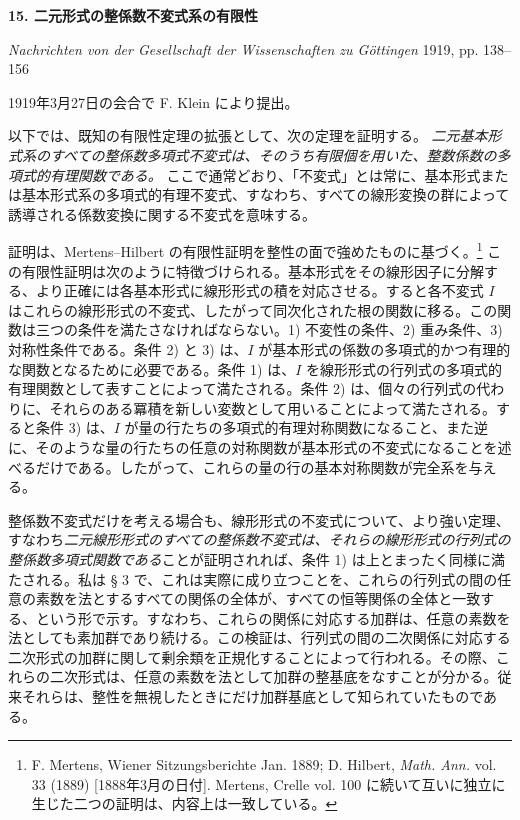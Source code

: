 \providecommand{\frH}{\mathfrak H}
\providecommand{\frK}{\mathfrak K}
\providecommand{\frM}{\mathfrak M}
\providecommand{\frN}{\mathfrak N}
\providecommand{\frG}{\mathfrak G}
\providecommand{\frS}{\mathfrak S}
\providecommand{\tmod}[1]{\;(\operatorname{mod} #1)}

\clearpage
\begin{center}
{\Large\bfseries 15. 二元形式の整係数不変式系の有限性}\par
\vspace{1em}
\emph{Nachrichten von der Gesellschaft der Wissenschaften zu Göttingen} 1919, pp. 138--156
\end{center}

\vspace{2em}
\begin{center}
1919年3月27日の会合で F. Klein により提出。
\end{center}

以下では、既知の有限性定理の拡張として、次の定理を証明する。
\emph{二元基本形式系のすべての整係数多項式不変式は、そのうち有限個を用いた、整数係数の多項式的有理関数である。}
ここで通常どおり、「不変式」とは常に、基本形式または基本形式系の多項式的有理不変式、すなわち、すべての線形変換の群によって誘導される係数変換に関する不変式を意味する。

証明は、Mertens--Hilbert の有限性証明を整性の面で強めたものに基づく。\footnote{F. Mertens, Wiener Sitzungsberichte Jan. 1889; D. Hilbert, \emph{Math. Ann.} vol. 33 (1889) [1888年3月の日付]. Mertens, Crelle vol. 100 に続いて互いに独立に生じた二つの証明は、内容上は一致している。}
この有限性証明は次のように特徴づけられる。基本形式をその線形因子に分解する、より正確には各基本形式に線形形式の積を対応させる。すると各不変式 \(I\) はこれらの線形形式の不変式、したがって同次化された根の関数に移る。この関数は三つの条件を満たさなければならない。1) 不変性の条件、2) 重み条件、3) 対称性条件である。条件 2) と 3) は、\(I\) が基本形式の係数の多項式的かつ有理的な関数となるために必要である。条件 1) は、\(I\) を線形形式の行列式の多項式的有理関数として表すことによって満たされる。条件 2) は、個々の行列式の代わりに、それらのある冪積を新しい変数として用いることによって満たされる。すると条件 3) は、\(I\) が量の行たちの多項式的有理対称関数になること、また逆に、そのような量の行たちの任意の対称関数が基本形式の不変式になることを述べるだけである。したがって、これらの量の行の基本対称関数が完全系を与える。

整係数不変式だけを考える場合も、線形形式の不変式について、より強い定理、すなわち\emph{二元線形形式のすべての整係数不変式は、それらの線形形式の行列式の整係数多項式関数である}ことが証明されれば、条件 1) は上とまったく同様に満たされる。私は § 3 で、これは実際に成り立つことを、これらの行列式の間の任意の素数を法とするすべての関係の全体が、すべての恒等関係の全体と一致する、という形で示す。すなわち、これらの関係に対応する加群は、任意の素数を法としても素加群であり続ける。この検証は、行列式の間の二次関係に対応する二次形式の加群に関して剰余類を正規化することによって行われる。その際、これらの二次形式は、任意の素数を法として加群の整基底をなすことが分かる。従来それらは、整性を無視したときにだけ加群基底として知られていたものである。

